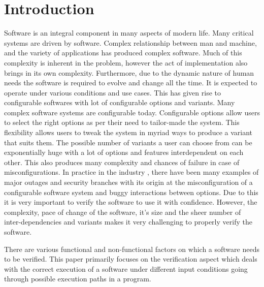 \documentclass[ runningheads,
               a4paper]{llncs}
\begin{document}
\section{Introduction}
Software is an integral component in many aspects of modern life. Many critical systems are driven by software. Complex relationship between man and machine, and the variety of applications has produced complex software. Much of this complexity is inherent in the problem, however the act of implementation also brings in its own complexity. Furthermore, due to the dynamic nature of human needs the software is required to evolve and change all the time. It is expected to operate under various conditions and use cases. This has given rise to configurable softwares with lot of configurable options and variants. Many complex software systems are configurable today. Configurable options allow users to select the right options as per their need to tailor-made the system. This flexibility allows users to tweak the system in myriad ways to produce a variant that suits them. The possible number of variants a user can choose from can be exponentially huge with a lot of options and features interdependent on each other. This also produces many complexity and chances of failure in case of misconfigurations. In practice in the industry \cite[Holistic configuration management at facebook]{tang2015holistic}, there have been many examples of major outages and security branches with its origin at the misconfiguration of a configurable software system and buggy interactions between options. Due to this it is very important to verify the software to use it with confidence. However, the complexity, pace of change of the software, it's size and the sheer number of inter-dependencies and variants makes it very challenging to properly verify the software.


There are various functional and non-functional factors on which a software needs to be verified. This paper primarily focuses on the verification aspect which deals with the correct execution of a software under different input conditions going through possible execution paths in a program.
\end{document}
